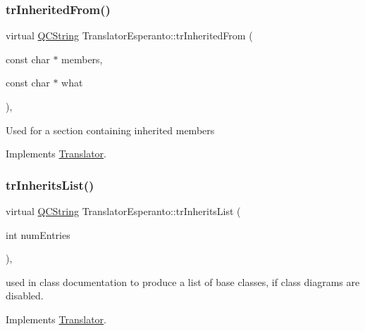 \mbox{\label{class_translator_esperanto_a4cbd025a08d322454c38971a2c4eda89}} 
\subsubsection{\texorpdfstring{trInheritedFrom()}{trInheritedFrom()}}
{\footnotesize\ttfamily virtual \mbox{\hyperlink{class_q_c_string}{Q\+C\+String}} Translator\+Esperanto\+::tr\+Inherited\+From (\begin{DoxyParamCaption}\item[{const char $\ast$}]{members,  }\item[{const char $\ast$}]{what }\end{DoxyParamCaption})\hspace{0.3cm}{\ttfamily [inline]}, {\ttfamily [virtual]}}

Used for a section containing inherited members 

Implements \mbox{\hyperlink{class_translator}{Translator}}.

\mbox{\label{class_translator_esperanto_ab9f5f68fe85c51c1b2ff0abd5507c453}} 
\subsubsection{\texorpdfstring{trInheritsList()}{trInheritsList()}}
{\footnotesize\ttfamily virtual \mbox{\hyperlink{class_q_c_string}{Q\+C\+String}} Translator\+Esperanto\+::tr\+Inherits\+List (\begin{DoxyParamCaption}\item[{int}]{num\+Entries }\end{DoxyParamCaption})\hspace{0.3cm}{\ttfamily [inline]}, {\ttfamily [virtual]}}

used in class documentation to produce a list of base classes, if class diagrams are disabled. 

Implements \mbox{\hyperlink{class_translator}{Translator}}.

\mbox{\label{class_translator_esperanto_af63d27bf9c500689f6bca09372589781}} 

